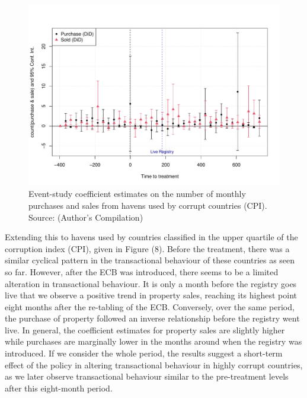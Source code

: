 \documentclass{article}
\begin{document}
\begin{figure}[H]
    \centering
    \includegraphics[width=1\linewidth]{CPI_purchase.sale.pdf}
    \caption{Event-study coefficient estimates on the number of monthly purchases and sales from havens used by corrupt countries (CPI). \\ Source: (Author's Compilation)}
    \label{fig:enter-label}
\end{figure}

Extending this to havens used by countries classified in the upper quartile of the corruption index (CPI), given in Figure (8). Before the treatment, there was a similar cyclical pattern in the transactional behaviour of these countries as seen so far. However, after the ECB was introduced, there seems to be a limited alteration in transactional behaviour. It is only a month before the registry goes live that we observe a positive trend in property sales, reaching its highest point eight months after the re-tabling of the ECB. Conversely, over the same period, the purchase of property followed an inverse relationship before the registry went live. In general, the coefficient estimates for property sales are slightly higher while purchases are marginally lower in the months around when the registry was introduced. If we consider the whole period, the results suggest a short-term effect of the policy in altering transactional behaviour in highly corrupt countries, as we later observe transactional behaviour similar to the pre-treatment levels after this eight-month period.
\end{document}
